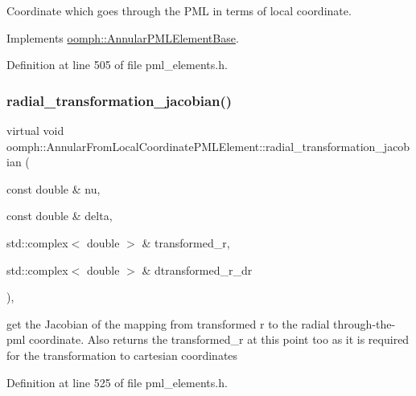 Coordinate which goes through the P\+ML in terms of local coordinate. 



Implements \hyperlink{classoomph_1_1AnnularPMLElementBase_ac6671111f31c3a5012d0df53a1c24b76}{oomph\+::\+Annular\+P\+M\+L\+Element\+Base}.



Definition at line 505 of file pml\+\_\+elements.\+h.

\mbox{\label{classoomph_1_1AnnularFromLocalCoordinatePMLElement_ab44027b0ebf468154752cc09d46d3a5d}} 
\subsubsection{\texorpdfstring{radial\+\_\+transformation\+\_\+jacobian()}{radial\_transformation\_jacobian()}}
{\footnotesize\ttfamily virtual void oomph\+::\+Annular\+From\+Local\+Coordinate\+P\+M\+L\+Element\+::radial\+\_\+transformation\+\_\+jacobian (\begin{DoxyParamCaption}\item[{const double \&}]{nu,  }\item[{const double \&}]{delta,  }\item[{std\+::complex$<$ double $>$ \&}]{transformed\+\_\+r,  }\item[{std\+::complex$<$ double $>$ \&}]{dtransformed\+\_\+r\+\_\+dr }\end{DoxyParamCaption})\hspace{0.3cm}{\ttfamily [inline]}, {\ttfamily [virtual]}}



get the Jacobian of the mapping from transformed r to the radial through-\/the-\/pml coordinate. Also returns the transformed\+\_\+r at this point too as it is required for the transformation to cartesian coordinates 



Definition at line 525 of file pml\+\_\+elements.\+h.

\mbox{\label{classoomph_1_1AnnularFromLocalCoordinatePMLElement_ab4e7e9103ffc587755a6149db1559688}} 
